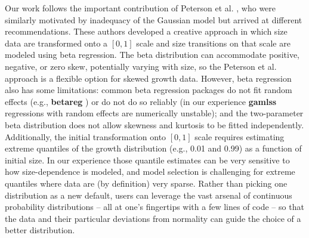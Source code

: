 \documentclass[12pt]{article}
\begin{document}
\begin{spacing}{1.9}
Our work follows the important contribution of Peterson et al. \citeyear{peterson2019improving}, who were similarly motivated by inadequacy of the Gaussian model but arrived at different recommendations. 
These authors developed a creative approach in which size data are transformed onto a $[0,1]$ scale and size transitions on that scale are modeled using beta regression. 
The beta distribution can accommodate positive, negative, or zero skew, potentially varying with size, so the Peterson et al. approach is a 
flexible option for skewed growth data. 
However, beta regression also has some limitations: common beta regression packages do not fit random effects (e.g., \textbf{betareg} \citep{cribari2010beta}) or do not do so reliably (in our experience \textbf{gamlss} regressions with random effects are numerically unstable); and the two-parameter beta distribution does not allow skewness and kurtosis to be fitted independently. 
Additionally, the initial transformation onto $[0,1]$ scale requires estimating extreme quantiles of the growth distribution (e.g., 0.01 and 0.99) as a function of initial size. 
In our experience those quantile estimates can be very sensitive to how size-dependence is modeled, and model selection is challenging for extreme quantiles where data are (by definition) very sparse. 
Rather than picking one distribution as a new default, users can leverage the vast arsenal of continuous probability distributions -- all at one's fingertips with a few lines of code -- so that the data and their particular deviations from normality can guide the choice of a better distribution. 


\end{spacing}
\end{document}
